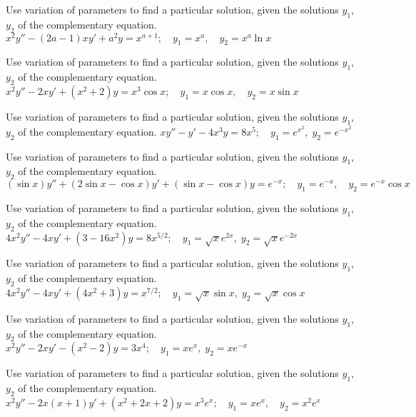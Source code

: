 \documentclass{ximera}
\begin{document}
\begin{problem}\label{exer:5.7.16}
Use variation
of parameters to find a particular solution, given the solutions
$y_1$, $y_2$ of the complementary equation. $x^2y''-(2a-1)xy'+a^2y=x^{a+1}; \quad  y_1=x^a,
\quad y_2=x^a \ln x$
\end{problem}

\begin{problem}\label{exer:5.7.17}
Use variation
of parameters to find a particular solution, given the solutions
$y_1$, $y_2$ of the complementary equation. $x^2y''-2xy'+(x^2+2)y=x^3\cos x; \quad  y_1=x\cos x,
\quad y_2=x\sin x$
\end{problem}

\begin{problem}\label{exer:5.7.18}
Use variation
of parameters to find a particular solution, given the solutions
$y_1$, $y_2$ of the complementary equation. $xy''-y'-4x^3y=8x^5;\quad  y_1=e^{x^2},\;  y_2=e^{-x^2}$
\end{problem}

\begin{problem}\label{exer:5.7.19}
Use variation
of parameters to find a particular solution, given the solutions
$y_1$, $y_2$ of the complementary equation. $(\sin x)y''+(2\sin x-\cos x)y'+(\sin x-\cos x)y=e^{-x}; \quad
y_1=e^{-x},\quad y_2=e^{-x}\cos x$
\end{problem}

\begin{problem}\label{exer:5.7.20}
Use variation
of parameters to find a particular solution, given the solutions
$y_1$, $y_2$ of the complementary equation. $4x^2y''-4xy'+(3-16x^2)y=8x^{5/2}; \quad  y_1=\sqrt xe^{2x},\;  y_2=\sqrt
xe^{-2x}$
\end{problem}

\begin{problem}\label{exer:5.7.21}
Use variation
of parameters to find a particular solution, given the solutions
$y_1$, $y_2$ of the complementary equation. $4x^2y''-4xy'+(4x^2+3)y=x^{7/2}; \quad  y_1=\sqrt x\sin x,\;
y_2=\sqrt x\cos x$
\end{problem}

\begin{problem}\label{exer:5.7.22}
Use variation
of parameters to find a particular solution, given the solutions
$y_1$, $y_2$ of the complementary equation. $x^2y''-2xy'-(x^2-2)y=3x^4;\quad  y_1=xe^x,\;  y_2=xe^{-x}$
\end{problem}

\begin{problem}\label{exer:5.7.23}
Use variation
of parameters to find a particular solution, given the solutions
$y_1$, $y_2$ of the complementary equation. $x^2y''-2x(x+1)y' +(x^2+2x+2)y=x^3e^x;   \quad y_1=xe^x, \quad y_2=x^2e^x$
\end{problem}
\end{document}
